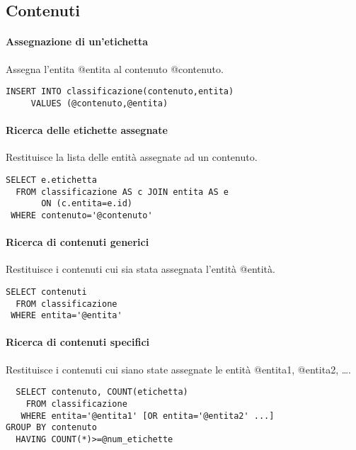 \subsection*{Contenuti}
\paragraph{Assegnazione di un'etichetta}
Assegna l'entita \textsf{@entita} al contenuto \textsf{@contenuto}.
\begin{verbatim}
INSERT INTO classificazione(contenuto,entita)
     VALUES (@contenuto,@entita)
\end{verbatim}

\paragraph{Ricerca delle etichette assegnate}
Restituisce la lista delle entità assegnate ad un contenuto.
\begin{verbatim}
SELECT e.etichetta
  FROM classificazione AS c JOIN entita AS e
       ON (c.entita=e.id)
 WHERE contenuto='@contenuto'
\end{verbatim}

\paragraph{Ricerca di contenuti generici}
Restituisce i contenuti cui sia stata assegnata l'entità \textsf{@entità}.
\begin{verbatim}
SELECT contenuti
  FROM classificazione
 WHERE entita='@entita'
\end{verbatim}

\paragraph{Ricerca di contenuti specifici}
Restituisce i contenuti cui siano state assegnate le entità \textsf{@entita1}, \textsf{@entita2}, \ldots .
\begin{verbatim}
  SELECT contenuto, COUNT(etichetta)
    FROM classificazione
   WHERE entita='@entita1' [OR entita='@entita2' ...]
GROUP BY contenuto
  HAVING COUNT(*)>=@num_etichette
\end{verbatim}
